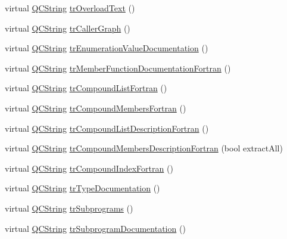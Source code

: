 \begin{DoxyCompactItemize}
virtual \mbox{\hyperlink{class_q_c_string}{Q\+C\+String}} \mbox{\hyperlink{class_translator_macedonian_a325b33ea816553dda7e4db9a7e6dee2b}{tr\+Overload\+Text}} ()
\item 
virtual \mbox{\hyperlink{class_q_c_string}{Q\+C\+String}} \mbox{\hyperlink{class_translator_macedonian_ae6ec7166ec1b58d7e9374e85f6b314c8}{tr\+Caller\+Graph}} ()
\item 
virtual \mbox{\hyperlink{class_q_c_string}{Q\+C\+String}} \mbox{\hyperlink{class_translator_macedonian_a196e4698019efb3bdd935f13a6f5b1cb}{tr\+Enumeration\+Value\+Documentation}} ()
\item 
virtual \mbox{\hyperlink{class_q_c_string}{Q\+C\+String}} \mbox{\hyperlink{class_translator_macedonian_a1409a1d2fe6e580a1ccd6f950bfa2652}{tr\+Member\+Function\+Documentation\+Fortran}} ()
\item 
virtual \mbox{\hyperlink{class_q_c_string}{Q\+C\+String}} \mbox{\hyperlink{class_translator_macedonian_ac7f1d2e172ebc00b325a67d3851b1851}{tr\+Compound\+List\+Fortran}} ()
\item 
virtual \mbox{\hyperlink{class_q_c_string}{Q\+C\+String}} \mbox{\hyperlink{class_translator_macedonian_ac1bffd6416f8e830325425beed610671}{tr\+Compound\+Members\+Fortran}} ()
\item 
virtual \mbox{\hyperlink{class_q_c_string}{Q\+C\+String}} \mbox{\hyperlink{class_translator_macedonian_a0445b7b88cb25d52e725abd2d252860b}{tr\+Compound\+List\+Description\+Fortran}} ()
\item 
virtual \mbox{\hyperlink{class_q_c_string}{Q\+C\+String}} \mbox{\hyperlink{class_translator_macedonian_a7ea39ab9ec65c73c0af7fbbc113d3f03}{tr\+Compound\+Members\+Description\+Fortran}} (bool extract\+All)
\item 
virtual \mbox{\hyperlink{class_q_c_string}{Q\+C\+String}} \mbox{\hyperlink{class_translator_macedonian_a332ca0f326cf962e09d5cc1a9ef407a8}{tr\+Compound\+Index\+Fortran}} ()
\item 
virtual \mbox{\hyperlink{class_q_c_string}{Q\+C\+String}} \mbox{\hyperlink{class_translator_macedonian_a45df65a66ff10498ef77c8a8eb0e06a7}{tr\+Type\+Documentation}} ()
\item 
virtual \mbox{\hyperlink{class_q_c_string}{Q\+C\+String}} \mbox{\hyperlink{class_translator_macedonian_ac418532b8c2560eacf53cc5faa2be2c5}{tr\+Subprograms}} ()
\item 
virtual \mbox{\hyperlink{class_q_c_string}{Q\+C\+String}} \mbox{\hyperlink{class_translator_macedonian_a04ac781c3d7e2712b6636af7b543c04f}{tr\+Subprogram\+Documentation}} ()

\end{DoxyCompactItemize}
